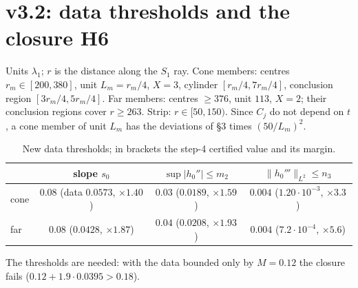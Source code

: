 \documentclass[11pt]{article}
\begin{document}
\section{v3.2: data thresholds and the closure H6}\label{sec:H6}
Units $\lambda_1$; $r$ is the distance along the $S_1$ ray. Cone members: centres $r_m\in[200,380]$, unit $L_m=r_m/4$, $X=3$, cylinder $[r_m/4,7r_m/4]$, conclusion region $[3r_m/4,5r_m/4]$. Far members: centres $\ge376$, unit $113$, $X=2$; their conclusion regions cover $r\ge263$. Strip: $r\in[50,150)$. Since $C_j$ do not depend on $t$, a cone member of unit $L_m$ has the deviations of \S3 times $(50/L_m)^2$.
\begin{table}[h]\centering\small
\begin{tabular}{lccc}\toprule
 & slope $s_0$ & $\sup|h_0''|\le m_2$ & $\|h_0'''\|_{L^2}\le n_3$\\\midrule
cone & $0.08$ (data $0.0573$, $\times1.40$) & $0.03$ ($0.0189$, $\times1.59$) & $0.004$ ($1.20\cdot10^{-3}$, $\times3.3$)\\
far & $0.08$ ($0.0428$, $\times1.87$) & $0.04$ ($0.0208$, $\times1.93$) & $0.004$ ($7.2\cdot10^{-4}$, $\times5.6$)\\\bottomrule
\end{tabular}\caption{New data thresholds; in brackets the step-4 certified value and its margin.}\label{tab:thr}\end{table}

\noindent The thresholds are needed: with the data bounded only by $M=0.12$ the closure fails ($0.12+1.9\cdot0.0395>0.18$).
\end{document}

